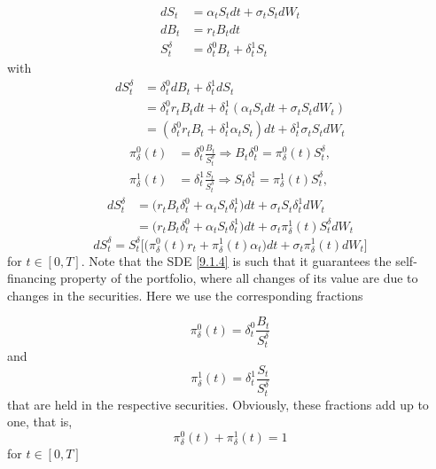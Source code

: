 \documentclass[a4 paper, 12pt]{report}
\theoremstyle{plain}
\begin{document}
\begin{align*}
    dS_t& = \alpha_tS_tdt+\sigma_tS_tdW_t\\
    dB_t& = r_tB_tdt\\
    S_t^\delta & = \delta_t^0B_t+\delta_t^1S_t
\end{align*}
with
\begin{align*}
    dS_t^\delta& = \delta_t^0dB_t+\delta_t^1dS_t\\
    & = \delta_t^0r_tB_tdt+\delta_t^1(\alpha_tS_tdt+\sigma_tS_tdW_t)\\
    & = (\delta_t^0r_tB_t+\delta_t^1\alpha_tS_t)dt+\delta_t^1\sigma_tS_tdW_t
\end{align*}
\begin{align*}
    \pi_\delta^0(t)& = \delta_t^0\frac{B_t}{S_t^\delta}\Longrightarrow B_t\delta_t^0 = \pi^0_\delta(t) S_t^\delta,\\
    \pi_\delta^1(t)& = \delta_t^1\frac{S_t}{S_t^\delta}\Longrightarrow S_t\delta_t^1 = \pi^1_\delta(t) S_t^\delta,
\end{align*}
\begin{align*}
dS_t^\delta & = \bigg(r_t B_t\delta_t^0+\alpha_tS_t\delta_t^1\bigg)dt+\sigma_tS_t\delta_t^1dW_t\\
& = \bigg(r_t B_t\delta_t^0+\alpha_tS_t\delta_t^1\bigg)dt+\sigma_t\pi^1_\delta(t)S_t^\delta dW_t
\end{align*}
\begin{equation}\label{9.1.4}
dS_t^\delta = S_t^\delta\bigg[\bigg(\pi_\delta^0(t)r_t+\pi_\delta^1(t)\alpha_t\bigg)dt+\sigma_t\pi_\delta^1(t)dW_t\bigg]
\end{equation}
for $t\in[0,T]$. Note that the SDE \eqref{9.1.4} is such that it guarantees the self-financing property of the portfolio, where all changes of its value are due to changes in the securities. Here we use the corresponding fractions

\begin{equation}\label{9.1.5}
\pi_\delta^0(t) = \delta_t^0\frac{B_t}{S_t^\delta}
\end{equation}
and 
\begin{equation}\label{9.1.6}
\pi_\delta^1(t) = \delta_t^1\frac{S_t}{S_t^\delta}
\end{equation}
that are held in the respective securities. Obviously, these fractions add up to one, that is,
\begin{equation}\label{9.1.7}
\pi_\delta^0(t)+\pi_\delta^1(t) = 1
\end{equation}
for $t\in[0,T]$\\
\end{document}
